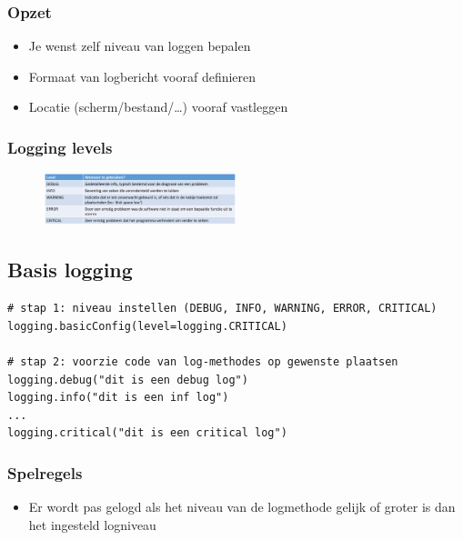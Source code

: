\documentclass{article}
\begin{document}
\subsubsection{Opzet}

\begin{itemize}
    \item Je wenst zelf niveau van loggen bepalen
    \item Formaat van logbericht vooraf definieren
    \item Locatie (scherm/bestand/\dots) vooraf vastleggen
\end{itemize}

\subsubsection{Logging levels}

\begin{figure}[H]
    \centering
    \includegraphics[width=0.5\textwidth]{logging-levels.png}
\end{figure}

\subsection{Basis logging}

\begin{verbatim}
# stap 1: niveau instellen (DEBUG, INFO, WARNING, ERROR, CRITICAL)
logging.basicConfig(level=logging.CRITICAL)

# stap 2: voorzie code van log-methodes op gewenste plaatsen
logging.debug("dit is een debug log")
logging.info("dit is een inf log")
...
logging.critical("dit is een critical log")
\end{verbatim}

\subsubsection{Spelregels}

\begin{itemize}
    \item Er wordt pas gelogd als het niveau van de logmethode gelijk of groter is dan het ingesteld logniveau
\end{itemize}
\end{document}
